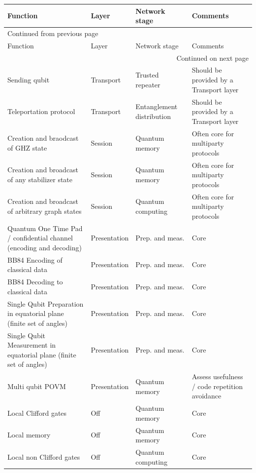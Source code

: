\documentclass[11pt]{article}
\begin{document}
\begin{longtable}{p{}|p{}|p{}|p{}}
Function & Layer & Network stage & Comments\\
\hline
\endfirsthead
\multicolumn{4}{l}{Continued from previous page} \\
\hline

Function & Layer & Network stage & Comments \\

\hline
\endhead
\hline\multicolumn{4}{r}{Continued on next page} \\
\endfoot
\endlastfoot
\hline
Sending qubit & Transport & Trusted repeater & Should be provided by a Transport layer\\
\hline
Teleportation protocol & Transport & Entanglement distribution & Should be provided by a Transport layer\\
\hline
Creation and braodcast of GHZ state & Session & Quantum memory & Often core for multiparty protocols\\
\hline
Creation and broadcast of any stabilizer state & Session & Quantum memory & Often core for multiparty protocols\\
\hline
Creation and broadcast of arbitrary graph states & Session & Quantum computing & Often core for multiparty protocols\\
\hline
Quantum One Time Pad / confidential channel (encoding and decoding) & Presentation & Prep. and meas. & Core\\
\hline
BB84 Encoding of classical data & Presentation & Prep. and meas. & Core\\
\hline
BB84 Decoding to classical data & Presentation & Prep. and meas. & Core\\
\hline
Single Qubit Preparation in equatorial plane (finite set of angles) & Presentation & Prep. and meas. & Core\\
\hline
Single Qubit Measurement in equatorial plane (finite set of angles) & Presentation & Prep. and meas. & Core\\
\hline
Multi qubit POVM & Presentation & Quantum memory & Assess usefulness / code repetition avoidance\\
\hline
Local Clifford gates & Off & Quantum memory & Core\\
\hline
Local memory & Off & Quantum memory & Core\\
\hline
Local non Clifford gates & Off & Quantum computing & Core\\

\end{longtable}
\end{document}
